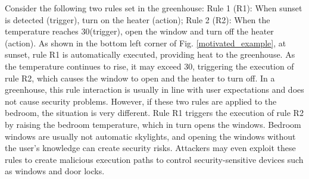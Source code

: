 	Consider the following two rules set in the greenhouse: Rule 1 (R1): When sunset is detected (trigger), turn on the heater (action); Rule 2 (R2): When the temperature reaches 30\celsius (trigger), open the window and turn off the heater (action). As shown in the bottom left corner of Fig. \ref{motivated_example}, at sunset, rule R1 is automatically executed, providing heat to the greenhouse. As the temperature continues to rise, it may exceed 30\celsius, triggering the execution of rule R2, which causes the window to open and the heater to turn off. In a greenhouse, this rule interaction is usually in line with user expectations and does not cause security problems. However, if these two rules are applied to the bedroom, the situation is very different. Rule R1 triggers the execution of rule R2 by raising the bedroom temperature, which in turn opens the windows. Bedroom windows are usually not automatic skylights, and opening the windows without the user's knowledge can create security risks. Attackers may even exploit these rules to create malicious execution paths to control security-sensitive devices such as windows and door locks.

